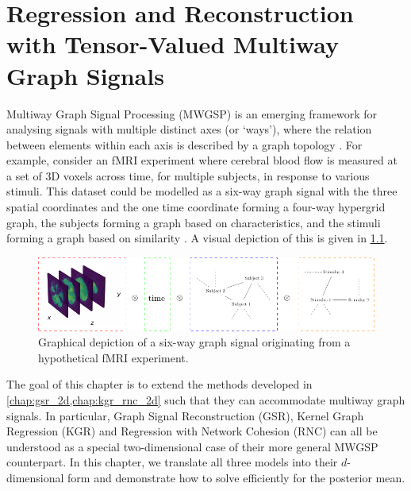 

\chapter{Regression and Reconstruction with Tensor-Valued
Multiway Graph Signals}


\label{chap:nd_gsp}


Multiway Graph Signal Processing (MWGSP) is an emerging framework for analysing signals with multiple distinct axes (or `ways'), where the relation between elements within each axis is described by a graph topology \citep{Stanley2020}. For example, consider an fMRI experiment where cerebral blood flow is measured at a set of 3D voxels across time, for multiple subjects, in response to various stimuli. This dataset could be modelled as a six-way graph signal with the three spatial coordinates and the one time coordinate forming a four-way hypergrid graph, the subjects forming a graph based on characteristics, and the stimuli forming a graph based on similarity \citep{Cichocki2015}. A visual depiction of this is given in \cref{fig:fMRI_diagram}. 
 
\vspace{1.5cm}

\begin{figure}[h] 
    \begin{center}
        \includegraphics[width=\linewidth]{Figures/fMRI_Digaram.pdf}
    \end{center}
   \caption[Graphical depiction of an order-3 tensor]{Graphical depiction of a six-way graph signal originating from a hypothetical fMRI experiment. } 
    \label{fig:fMRI_diagram}
\end{figure} 


The goal of this chapter is to extend the methods developed in \cref{chap:gsr_2d,chap:kgr_rnc_2d} such that they can accommodate multiway graph signals. In particular, Graph Signal Reconstruction (GSR), Kernel Graph Regression (KGR) and Regression with Network Cohesion (RNC) can all be understood as a special two-dimensional case of their more general MWGSP counterpart. In this chapter, we translate all three models into their $d$-dimensional form and demonstrate how to solve efficiently for the posterior mean.  


